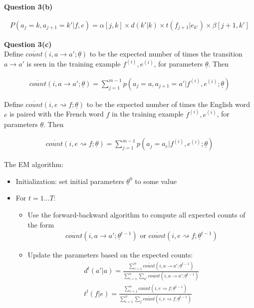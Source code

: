 \documentclass[12pt]{article}
\begin{document}
{\bf Question 3(b)}

\begin{eqnarray*}
P(a_j = k, a_{j+1} = k'|f,e) = \alpha [j, k] \times d(k'|k) \times
t(f_{j+1}|e_{k'}) \times \beta [j+1, k']
\end{eqnarray*}

{\bf Question 3(c)} \\

Define $\overline {count}(i, a \to a'; \underline {\theta})$ to be
the expected number of times the transition  $a \to a'$ is seen
in the training example $f^{(i)}, e^{(i)}$, for parameters $\underline
{\theta}$. Then

\begin{eqnarray*}
\overline {count}(i, a \to a'; \underline {\theta}) =
\sum^{m-1}_{j=1} p(a_j = a, a_{j+1} = a'| f^{(i)}, e^{(i)}; \underline
{\theta})
\end{eqnarray*}

Define $\overline {count}(i, e \rightsquigarrow f; \underline
{\theta})$ to be the expected number of times the English word $e$ is
paired with the French word $f$ in the training example $f^{(i)},
e^{(i)}$, for parameters $\underline {\theta}$. Then

\begin{eqnarray*}
\overline {count}(i, e \rightsquigarrow f; \underline {\theta}) =
\sum^{m-1}_{j=1} p(a_j = a_e | f^{(i)}, e^{(i)}; \underline {\theta})
\end{eqnarray*}

The EM algorithm:

\begin{itemize}
\item Initialization: set initial parameters $\underline {\theta}^0$ to
  some value
\item For $t = 1...T$:
  \begin{itemize}
  \item Use the forward-backward algorithm to compute all expected
    counts of the form
    \begin{eqnarray*}
      \overline {count}(i, a \to a'; \underline {\theta}^{t-1})
      \text{ or }
      \overline {count}(i, e \rightsquigarrow f; \underline
      {\theta}^{t-1})
    \end{eqnarray*}
  \item Update the parameters based on the expected counts:
    \begin{eqnarray*}
      d^t(a'|a) = \frac {\sum^n_{i=1} \overline {count}(i, a \to a';
        \underline {\theta}^{t-1})}
      {\sum^n_{i=1} \sum_{a'} \overline {count}(i, a \to a';
        \underline {\theta}^{t-1})} \\
      t^t(f|e) = \frac {\sum^n_{i=1} \overline {count}(i, e
        \rightsquigarrow f; \underline {\theta}^{t-1})}
      {\sum^n_{i=1} \sum_f \overline {count}(i, e \rightsquigarrow f;
        \underline {\theta}^{t-1})}
    \end{eqnarray*}
  \end{itemize}
\end{itemize}
\end{document}
